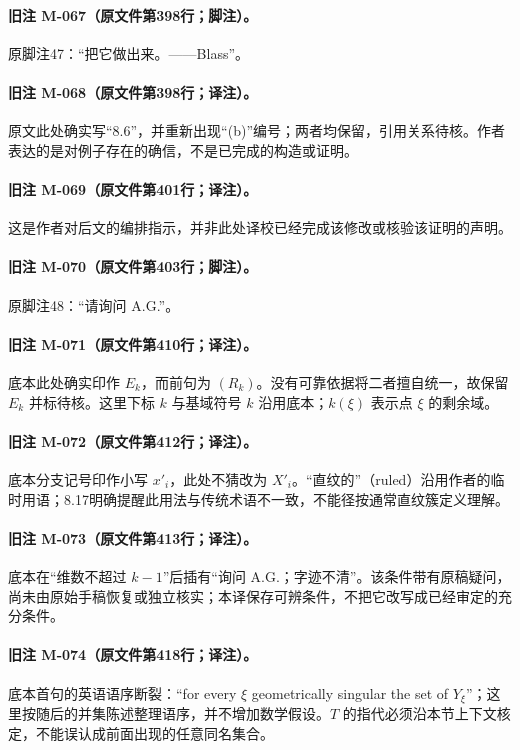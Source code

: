 \documentclass[UTF8,a4paper]{ctexbook}
\begin{document}
\paragraph{旧注 M-067（原文件第398行；脚注）。}
原脚注47：“把它做出来。——Blass”。

\paragraph{旧注 M-068（原文件第398行；译注）。}
原文此处确实写“8.6”，并重新出现“(b)”编号；两者均保留，引用关系待核。作者表达的是对例子存在的确信，不是已完成的构造或证明。

\paragraph{旧注 M-069（原文件第401行；译注）。}
这是作者对后文的编排指示，并非此处译校已经完成该修改或核验该证明的声明。

\paragraph{旧注 M-070（原文件第403行；脚注）。}
原脚注48：“请询问 A.G.”。

\paragraph{旧注 M-071（原文件第410行；译注）。}
底本此处确实印作 $E_k$，而前句为 $(R_k)$。没有可靠依据将二者擅自统一，故保留 $E_k$ 并标待核。这里下标 $k$ 与基域符号 $k$ 沿用底本；$k(\xi)$ 表示点 $\xi$ 的剩余域。

\paragraph{旧注 M-072（原文件第412行；译注）。}
底本分支记号印作小写 $x'_i$，此处不猜改为 $X'_i$。“直纹的”（ruled）沿用作者的临时用语；8.17明确提醒此用法与传统术语不一致，不能径按通常直纹簇定义理解。

\paragraph{旧注 M-073（原文件第413行；译注）。}
底本在“维数不超过 $k-1$”后插有“询问 A.G.；字迹不清”。该条件带有原稿疑问，尚未由原始手稿恢复或独立核实；本译保存可辨条件，不把它改写成已经审定的充分条件。

\paragraph{旧注 M-074（原文件第418行；译注）。}
底本首句的英语语序断裂：“for every $\xi$ geometrically singular the set of $Y_\xi$”；这里按随后的并集陈述整理语序，并不增加数学假设。$T$ 的指代必须沿本节上下文核定，不能误认成前面出现的任意同名集合。
\end{document}
